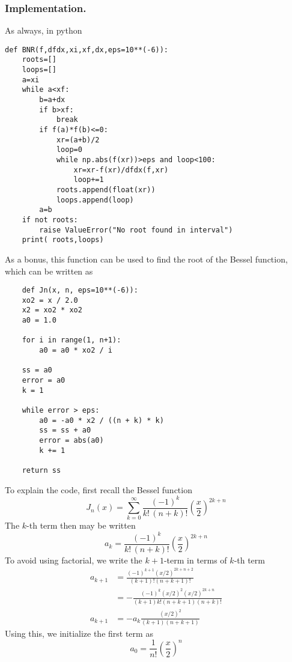 \documentclass[../../../main.tex]{subfiles}
\begin{document}
\subsubsection*{Implementation.} As always, in python
\begin{verbatim}
def BNR(f,dfdx,xi,xf,dx,eps=10**(-6)):
    roots=[]
    loops=[]
    a=xi
    while a<xf:
        b=a+dx 
        if b>xf:
            break
        if f(a)*f(b)<=0:
            xr=(a+b)/2
            loop=0 
            while np.abs(f(xr))>eps and loop<100:
                xr=xr-f(xr)/dfdx(f,xr)
                loop+=1
            roots.append(float(xr))
            loops.append(loop)
        a=b
    if not roots:
        raise ValueError("No root found in interval")
    print( roots,loops)
\end{verbatim}

As a bonus, this function can be used to find the root of the Bessel function, which can be written as
\begin{verbatim}
    def Jn(x, n, eps=10**(-6)):
    xo2 = x / 2.0
    x2 = xo2 * xo2
    a0 = 1.0

    for i in range(1, n+1):
        a0 = a0 * xo2 / i
    
    ss = a0
    error = a0
    k = 1
    
    while error > eps:
        a0 = -a0 * x2 / ((n + k) * k)
        ss = ss + a0
        error = abs(a0)
        k += 1
    
    return ss
\end{verbatim}
To explain the code, first recall the Bessel function
\begin{equation*}
    J_n(x) = \sum_{k=0}^{\infty} \frac{(-1)^k}{k! \, (n+k)!} \left( \frac{x}{2} \right)^{2k+n}
\end{equation*}
The $k$-th term then may be written
\begin{equation*}
    a_k = \frac{(-1)^k}{k! \, (n+k)!} \left( \frac{x}{2} \right)^{2k+n}
\end{equation*}
To avoid using factorial, we write the $k+1$-term in terms of $k$-th term
\begin{align*}
    a_{k+1} & = \frac{(-1)^{k+1}(x/2)^{2k+n+2}}{(k+1)!(n+k+1)!}          \\
            & = -\frac{(-1)^k(x/2)^2(x/2)^{2k+n }}{(k+1)k!(n+k+1)(n+k)!} \\
    a_{k+1} & = -a_k\frac{(x/2)^2}{(k+1)(n+k+1)}
\end{align*}
Using this, we initialize the first term as
\begin{equation*}
    a_0=\frac{1 }{n!}\left( \frac{x }{2 } \right) ^n
\end{equation*}
\end{document}
